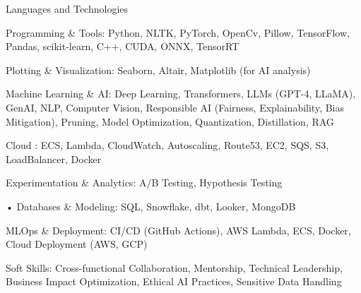 

\begin{cventries}

  \cventry
    {Languages and Technologies}
    {}
    {}
    {}
    {
     \begin{cvitems} %
      \item {Programming \& Tools: Python, NLTK, PyTorch, OpenCv, Pillow, TensorFlow, Pandas, 
        scikit-learn, C++, CUDA, ONNX, TensorRT}	
      \item {Plotting \& Visualization: Seaborn, Altair, Matplotlib (for AI analysis)}
      \item {Machine Learning \& AI: Deep Learning, Transformers, LLMs (GPT-4, LLaMA), GenAI, NLP, 
        Computer Vision, Responsible AI (Fairness, Explainability, Bias Mitigation), Pruning, Model Optimization, Quantization, Distillation, RAG}	
      \item {Cloud : ECS, Lambda, CloudWatch, Autoscaling, Route53, EC2, SQS, S3, LoadBalancer, Docker}
      \item {Experimentation \& Analytics:  A/B Testing, Hypothesis Testing}
	    \item {• Databases \& Modeling: SQL, Snowflake, dbt, Looker, MongoDB}
      \item {MLOps \& Deployment: CI/CD (GitHub Actions), AWS Lambda, ECS, Docker, Cloud Deployment (AWS, GCP)}
      \item {Soft Skills: Cross-functional Collaboration, Mentorship, Technical Leadership, 
      Business Impact Optimization, Ethical AI Practices, Sensitive Data Handling}
     \end{cvitems}
    }

\end{cventries}

